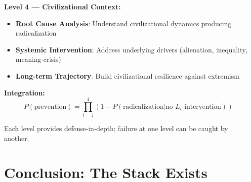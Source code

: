\documentclass[11pt,twoside]{book}
\begin{document}
\begin{tcolorbox}[colback=green!5!white,colframe=green!65!black,title=\textbf{Counter-Terrorism Stack Deployment},breakable]
\textbf{Level 4 --- Civilizational Context:}
\begin{itemize}
    \item \textbf{Root Cause Analysis}: Understand civilizational dynamics producing radicalization
    \item \textbf{Systemic Intervention}: Address underlying drivers (alienation, inequality, meaning-crisis)
    \item \textbf{Long-term Trajectory}: Build civilizational resilience against extremism
\end{itemize}

\textbf{Integration:}
\begin{equation}
    P(\text{prevention}) = \prod_{i=1}^{4} \left(1 - P(\text{radicalization} | \text{no } L_i \text{ intervention})\right)
\end{equation}

Each level provides defense-in-depth; failure at one level can be caught by another.

\end{tcolorbox}

\chapter*{Conclusion: The Stack Exists}
\end{document}
